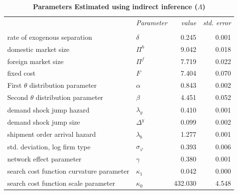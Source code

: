\documentclass[12pt,titlepage]{article}
\begin{document}
\begin{table}
    \centering
    {\small 
    \begin{tabular}{llrr} \hline \hline 
        & \textit{Parameter}   & \textit{value} & \textit{std. error} \\ \cline{2-4} \\
        rate of exogenous separation                                 & $\delta $            & 0.245          & 0.001               \\
        domestic market size                                         & $\Pi ^{h}$           & 9.042         & 0.018               \\
        foreign market size                                          & $\Pi ^{f}$           & 7.719         & 0.022               \\
        fixed cost                                                   & $F$                  & 7.404          & 0.070               \\
        First $\theta $ distribution parameter                       & $\alpha $            & 0.843          & 0.002               \\
        Second $\theta $ distribution parameter                      & $\beta $             & 4.451          & 0.052               \\
        demand shock jump hazard                                     & $\lambda _{y}$       & 0.410          & 0.001               \\
        demand shock jump size                                       & $\Delta ^{y}$        & 0.099          & 0.002               \\
        shipment order arrival hazard                                & $\lambda _{b}$       & 1.277          & 0.001               \\
        std. deviation, log firm type                                & $\sigma _{\varphi }$ & 0.393           & 0.006               \\
        network effect parameter                                     & $\gamma $            & 0.380          & 0.001               \\
        \multicolumn{1}{c}{search cost function curvature parameter} & $\kappa _{1}$        & 0.042          & 0.000               \\
        search cost function scale parameter                         & $\kappa _{0}$        & 432.030        & 4.548               \\
        \hline
    \end{tabular}%
    }
    \caption{\textbf{Parameters Estimated using indirect inference ($\Lambda $)}}
\end{table}
\end{document}
